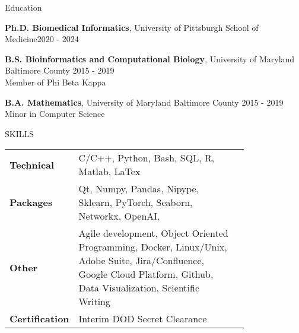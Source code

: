 \documentclass{resume} %
\begin{document}

\begin{rSection}{Education}

{\bf Ph.D. Biomedical Informatics}, University of Pittsburgh School of Medicine\hfill {2020 - 2024}

{\bf B.S. Bioinformatics and Computational Biology}, University of Maryland Baltimore County \hfill {2015 - 2019}\\
Member of Phi Beta Kappa

{\bf B.A. Mathematics}, University of Maryland Baltimore County \hfill {2015 - 2019} \\
Minor in Computer Science \smallskip 

\end{rSection}

\begin{rSection}{SKILLS}

\begin{tabular}{ @{} >{\bfseries}l p{0.8\linewidth} l }
Technical  & C/C++, Python, Bash, SQL, R, Matlab, LaTex \\
Packages & Qt, Numpy, Pandas, Nipype, Sklearn, PyTorch, Seaborn, Networkx, OpenAI,  \\
Other  & Agile development, Object Oriented Programming, Docker, Linux/Unix, Adobe Suite, Jira/Confluence, Google Cloud Platform, Github, Data Visualization, Scientific Writing\\
Certification & Interim DOD Secret Clearance

\end{tabular}\\
\end{rSection}
\end{document}
